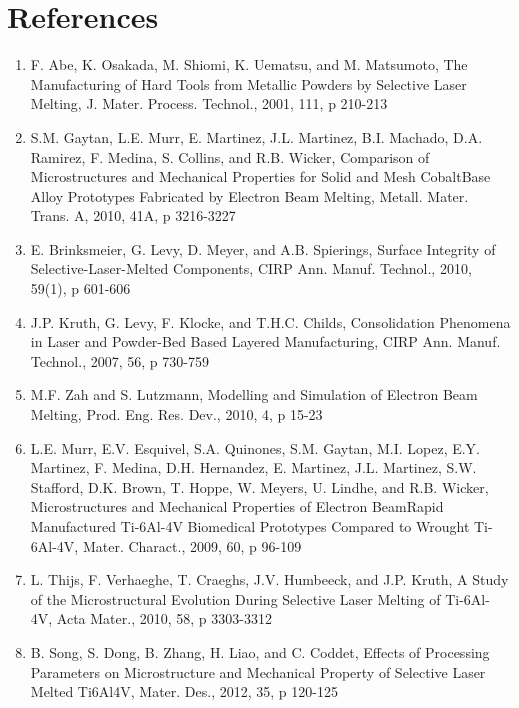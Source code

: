 \documentclass[10pt]{article}
\begin{document}
\section*{References}
\begin{enumerate}
  \item F. Abe, K. Osakada, M. Shiomi, K. Uematsu, and M. Matsumoto, The Manufacturing of Hard Tools from Metallic Powders by Selective Laser Melting, J. Mater. Process. Technol., 2001, 111, p 210-213

  \item S.M. Gaytan, L.E. Murr, E. Martinez, J.L. Martinez, B.I. Machado, D.A. Ramirez, F. Medina, S. Collins, and R.B. Wicker, Comparison of Microstructures and Mechanical Properties for Solid and Mesh CobaltBase Alloy Prototypes Fabricated by Electron Beam Melting, Metall. Mater. Trans. A, 2010, 41A, p 3216-3227

  \item E. Brinksmeier, G. Levy, D. Meyer, and A.B. Spierings, Surface Integrity of Selective-Laser-Melted Components, CIRP Ann. Manuf. Technol., 2010, 59(1), p 601-606

  \item J.P. Kruth, G. Levy, F. Klocke, and T.H.C. Childs, Consolidation Phenomena in Laser and Powder-Bed Based Layered Manufacturing, CIRP Ann. Manuf. Technol., 2007, 56, p 730-759

  \item M.F. Zah and S. Lutzmann, Modelling and Simulation of Electron Beam Melting, Prod. Eng. Res. Dev., 2010, 4, p 15-23

  \item L.E. Murr, E.V. Esquivel, S.A. Quinones, S.M. Gaytan, M.I. Lopez, E.Y. Martinez, F. Medina, D.H. Hernandez, E. Martinez, J.L. Martinez, S.W. Stafford, D.K. Brown, T. Hoppe, W. Meyers, U. Lindhe, and R.B. Wicker, Microstructures and Mechanical Properties of Electron BeamRapid Manufactured Ti-6Al-4V Biomedical Prototypes Compared to Wrought Ti-6Al-4V, Mater. Charact., 2009, 60, p 96-109

  \item L. Thijs, F. Verhaeghe, T. Craeghs, J.V. Humbeeck, and J.P. Kruth, A Study of the Microstructural Evolution During Selective Laser Melting of Ti-6Al-4V, Acta Mater., 2010, 58, p 3303-3312

  \item B. Song, S. Dong, B. Zhang, H. Liao, and C. Coddet, Effects of Processing Parameters on Microstructure and Mechanical Property of Selective Laser Melted Ti6Al4V, Mater. Des., 2012, 35, p 120-125


\end{enumerate}
\end{document}
